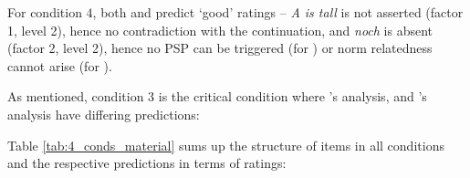\documentclass[output=paper,
modfonts
]{langscibook}
\begin{document}
For condition $4$, both \citeauthor{Hofstetter2013} and \citeauthor{umbach2009a_comp} predict `good' ratings -- \textit{A is tall} is not asserted (factor 1, level 2), hence no contradiction with the continuation, and \textit{noch} is absent (factor 2, level 2), hence no PSP can be triggered (for \citeauthor{Hofstetter2013}) or norm relatedness cannot arise (for \citeauthor{umbach2009a_comp}).

As mentioned, condition 3 is the critical condition where \citeauthor{Hofstetter2013}'s \citeyearpar{Hofstetter2013} analysis, and \citeauthor{umbach2009a_comp}'s \citeyearpar{umbach2009a_comp} analysis have differing predictions:

Table \ref{tab:4_conds_material} sums up the structure of items in all conditions and the respective predictions in terms of ratings:
\end{document}
